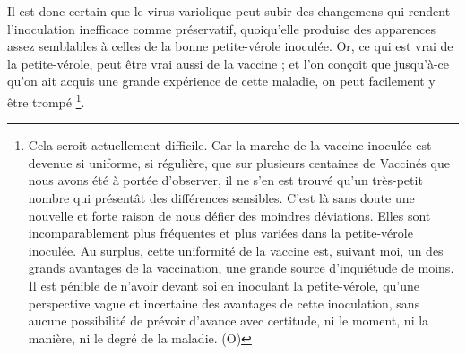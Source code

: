 Il est donc certain que le virus variolique peut subir des changemens qui rendent l'inoculation inefficace comme préservatif, quoiqu'elle produise des apparences assez semblables à celles de la bonne petite-vérole inoculée. Or, ce qui est vrai de la petite-vérole, peut être vrai aussi de la vaccine ; et l'on conçoit que jusqu'à-ce qu'on ait acquis une grande expérience de cette maladie, on peut facilement y être trompé \footnote{Cela seroit actuellement difficile. Car la marche de la vaccine inoculée est devenue si uniforme, si régulière, que sur plusieurs centaines de Vaccinés que nous avons été à portée d'observer, il ne s'en est trouvé qu'un très-petit nombre qui présentât des différences sensibles. C'est là sans doute une nouvelle et forte raison de nous défier des moindres déviations. Elles sont incomparablement plus fréquentes et plus variées dans la petite-vérole inoculée. Au surplus, cette uniformité de la vaccine est, suivant moi, un des grands avantages de la vaccination, une grande source d'inquiétude de moins. Il est pénible de n'avoir devant soi en inoculant la petite-vérole, qu'une perspective vague et incertaine des avantages de cette inoculation, sans aucune possibilité de prévoir d'avance avec certitude, ni le moment, ni la manière, ni le degré de la maladie. (O)}.
\setcounter{page}{275}
